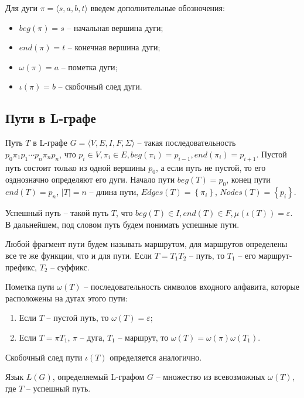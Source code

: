\documentclass{article}
\begin{document}
Для дуги $\pi = \langle s, a, b, t \rangle$ введем дополнительные обозночения:
\begin{itemize}
    \item $beg(\pi) = s$ -- начальная вершина дуги;
    \item $end(\pi) = t$ -- конечная вершина дуги;
    \item $\omega(\pi) = a$ -- пометка дуги;
    \item $\iota(\pi) = b$ -- скобочный след дуги.
\end{itemize}

\subsection{Пути в L-графе}
Путь $T$ в L-графе $G=\langle V,E,I,F,\Sigma\rangle$ -- такая последовательность \\ 
$p_0 \pi_1 p_1 \cdots p_n \pi_n p_n$, что 
$p_i \in V, \pi_i \in E, beg(\pi_i) = p_{i-1}, end(\pi_i) = p_{i+1}$.
Пустой путь состоит только из одной вершины $p_0$, а если путь не пустой, то его озднозначно определяют его дуги.
Начало пути $beg(T) = p_0$, конец пути $end(T) = p_n$, $\left| T \right| = n$ -- длина пути, 
$Edges(T) = \left\{ \pi_i \right\}$, $Nodes(T) = \left\{ p_i \right\}$.

Успешный путь -- такой путь $T$, что $beg(T) \in I, end(T) \in F, \mu(\iota(T)) = \varepsilon$.
В дальнейшем, под словом путь будем понимать успешные пути.

Любой фрагмент пути будем называть маршрутом, для маршрутов определены все те же функции, что и для пути.
Если $T = T_1 T_2$ -- путь, то $T_1$ -- его маршрут-префикс, $T_2$ -- суффикс.

Пометка пути $\omega(T)$ -- последовательность символов входного алфавита, которые расположены на дугах этого пути:
\begin{enumerate}
    \item Если $T$ -- пустой путь, то $\omega(T) = \varepsilon$;
    \item Если $T = \pi T_1$, $\pi$ -- дуга, $T_1$ -- маршрут, то $\omega(T) = \omega(\pi) \omega(T_1)$.
\end{enumerate}

Скобочный след пути $\iota(T)$ определяется аналогично.

Язык $L(G)$, определяемый L-графом $G$ -- множество из всевозможных $\omega(T)$, где $T$ -- успешный путь.
\end{document}
